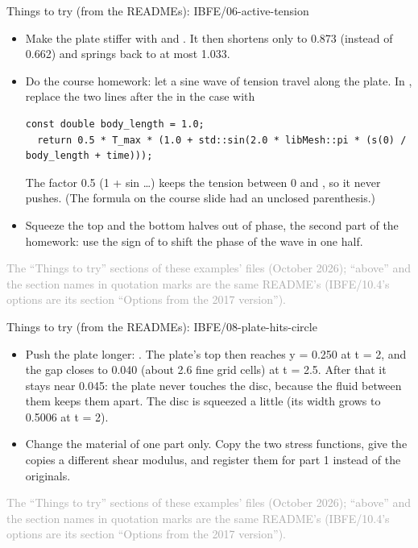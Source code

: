 \documentclass[aspectratio=169,11pt]{beamer}
\newcommand{\sourcecredit}[1]{\vfill\begin{flushright}\tiny\textcolor{DarkGray}{#1}\end{flushright}}
\begin{document}
\begin{frame}[fragile]{Things to try (from the READMEs): IBFE/06-active-tension}
\scriptsize\setlength{\leftmargini}{5em}
\begin{itemize}\setlength{\itemsep}{1pt}
  \item[IBFE/06.1] Make the plate stiffer with  and . It then shortens only to 0.873 (instead of 0.662) and springs back to at most 1.033.
  \item[IBFE/06.2] Do the course homework: let a sine wave of tension travel along the plate. In , replace the two lines after the  in the  case with
\begin{lstlisting}[style=cpptiny]
  const double body_length = 1.0;
  return 0.5 * T_max * (1.0 + std::sin(2.0 * libMesh::pi * (s(0) / body_length + time)));
\end{lstlisting} The factor 0.5 (1 + sin \ldots{}) keeps the tension between 0 and , so it never pushes. (The formula on the course slide had an unclosed parenthesis.)
  \item[IBFE/06.3] Squeeze the top and the bottom halves out of phase, the second part of the homework: use the sign of  to shift the phase of the wave in one half.
\end{itemize}
\sourcecredit{The ``Things to try'' sections of these examples' \code{README.md} files (October 2026); ``above'' and the section names in quotation marks are the same README's (IBFE/10.4's options are its section ``Options from the 2017 version'').}
\end{frame}

\begin{frame}{Things to try (from the READMEs): IBFE/08-plate-hits-circle}
\scriptsize\setlength{\leftmargini}{5em}
\begin{itemize}\setlength{\itemsep}{1pt}
  \item[IBFE/08.1] Push the plate longer: . The plate's top then reaches y = 0.250 at t = 2, and the gap closes to 0.040 (about 2.6 fine grid cells) at t = 2.5. After that it stays near 0.045: the plate never touches the disc, because the fluid between them keeps them apart. The disc is squeezed a little (its width grows to 0.5006 at t = 2).
  \item[IBFE/08.2] Change the material of one part only. Copy the two stress functions, give the copies a different shear modulus, and register them for part 1 instead of the originals.
\end{itemize}
\sourcecredit{The ``Things to try'' sections of these examples' \code{README.md} files (October 2026); ``above'' and the section names in quotation marks are the same README's (IBFE/10.4's options are its section ``Options from the 2017 version'').}
\end{frame}
\end{document}

